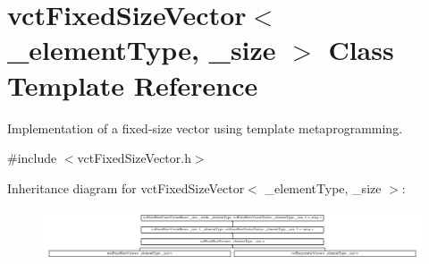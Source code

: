 \hypertarget{classvct_fixed_size_vector}{\section{vct\-Fixed\-Size\-Vector$<$ \-\_\-element\-Type, \-\_\-size $>$ Class Template Reference}
\label{classvct_fixed_size_vector}
}


Implementation of a fixed-\/size vector using template metaprogramming.  




{\ttfamily \#include $<$vct\-Fixed\-Size\-Vector.\-h$>$}

Inheritance diagram for vct\-Fixed\-Size\-Vector$<$ \-\_\-element\-Type, \-\_\-size $>$\-:\begin{figure}[H]
\begin{center}
\leavevmode
\includegraphics[height=1.555556cm]{d6/d2d/classvct_fixed_size_vector}
\end{center}
\end{figure}
